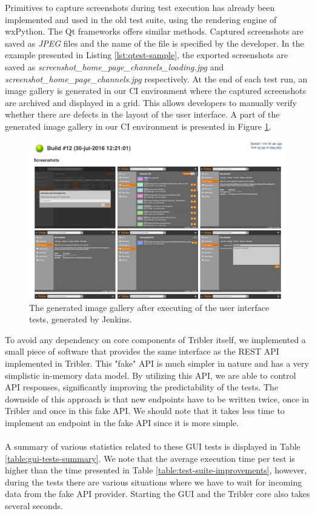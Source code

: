 Primitives to capture screenshots during test execution has already been implemented and used in the old test suite, using the rendering engine of wxPython. The Qt frameworks offers similar methods. Captured screenshots are saved as \emph{JPEG} files and the name of the file is specified by the developer. In the example presented in Listing \ref{lst:qtest-sample}, the exported screenshots are saved as \emph{screenshot\_home\_page\_channels\_loading.jpg} and \emph{screenshot\_home\_page\_channels.jpg} respectively. At the end of each test run, an image gallery is generated in our CI environment where the captured screenshots are archived and displayed in a grid. This allows developers to manually verify whether there are defects in the layout of the user interface. A part of the generated image gallery in our CI environment is presented in Figure \ref{fig:jenkins-gallery}.\\

\begin{figure}[h!]
	\centering
	\includegraphics[width=1.0\columnwidth]{images/improving_qa/gallery_jenkins}
	\caption{The generated image gallery after executing of the user interface tests, generated by Jenkins.}
	\label{fig:jenkins-gallery}
\end{figure}

\noindent To avoid any dependency on core components of Tribler itself, we implemented a small piece of software that provides the same interface as the REST API implemented in Tribler. This "fake" API is much simpler in nature and has a very simplistic in-memory data model. By utilizing this API, we are able to control API responses, significantly improving the predictability of the tests. The downside of this approach is that new endpoints have to be written twice, once in Tribler and once in this fake API. We should note that it takes less time to implement an endpoint in the fake API since it is more simple.\\\\
A summary of various statistics related to these GUI tests is displayed in Table \ref{table:gui-tests-summary}. We note that the average execution time per test is higher than the time presented in Table \ref{table:test-suite-improvements}, however, during the tests there are various situations where we have to wait for incoming data from the fake API provider. Starting the GUI and the Tribler core also takes several seconds.

